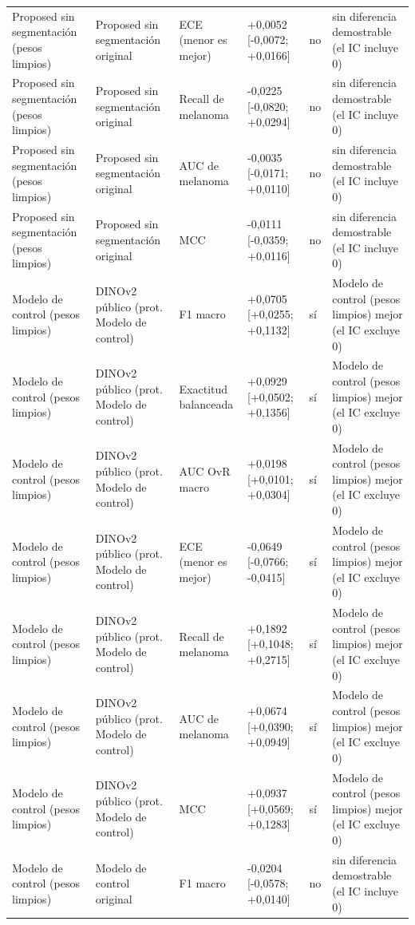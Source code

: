 \begin{longtable}{@{}llllll@{}}
Proposed sin segmentación (pesos limpios) & Proposed sin segmentación original & ECE (menor es mejor) & +0,0052 [-0,0072; +0,0166] & no & sin diferencia demostrable (el IC incluye 0) \\
Proposed sin segmentación (pesos limpios) & Proposed sin segmentación original & Recall de melanoma & -0,0225 [-0,0820; +0,0294] & no & sin diferencia demostrable (el IC incluye 0) \\
Proposed sin segmentación (pesos limpios) & Proposed sin segmentación original & AUC de melanoma & -0,0035 [-0,0171; +0,0110] & no & sin diferencia demostrable (el IC incluye 0) \\
Proposed sin segmentación (pesos limpios) & Proposed sin segmentación original & MCC & -0,0111 [-0,0359; +0,0116] & no & sin diferencia demostrable (el IC incluye 0) \\
Modelo de control (pesos limpios) & DINOv2 público (prot. Modelo de control) & F1 macro & +0,0705 [+0,0255; +0,1132] & sí & Modelo de control (pesos limpios) mejor (el IC excluye 0) \\
Modelo de control (pesos limpios) & DINOv2 público (prot. Modelo de control) & Exactitud balanceada & +0,0929 [+0,0502; +0,1356] & sí & Modelo de control (pesos limpios) mejor (el IC excluye 0) \\
Modelo de control (pesos limpios) & DINOv2 público (prot. Modelo de control) & AUC OvR macro & +0,0198 [+0,0101; +0,0304] & sí & Modelo de control (pesos limpios) mejor (el IC excluye 0) \\
Modelo de control (pesos limpios) & DINOv2 público (prot. Modelo de control) & ECE (menor es mejor) & -0,0649 [-0,0766; -0,0415] & sí & Modelo de control (pesos limpios) mejor (el IC excluye 0) \\
Modelo de control (pesos limpios) & DINOv2 público (prot. Modelo de control) & Recall de melanoma & +0,1892 [+0,1048; +0,2715] & sí & Modelo de control (pesos limpios) mejor (el IC excluye 0) \\
Modelo de control (pesos limpios) & DINOv2 público (prot. Modelo de control) & AUC de melanoma & +0,0674 [+0,0390; +0,0949] & sí & Modelo de control (pesos limpios) mejor (el IC excluye 0) \\
Modelo de control (pesos limpios) & DINOv2 público (prot. Modelo de control) & MCC & +0,0937 [+0,0569; +0,1283] & sí & Modelo de control (pesos limpios) mejor (el IC excluye 0) \\
Modelo de control (pesos limpios) & Modelo de control original & F1 macro & -0,0204 [-0,0578; +0,0140] & no & sin diferencia demostrable (el IC incluye 0) \\

\end{longtable}
